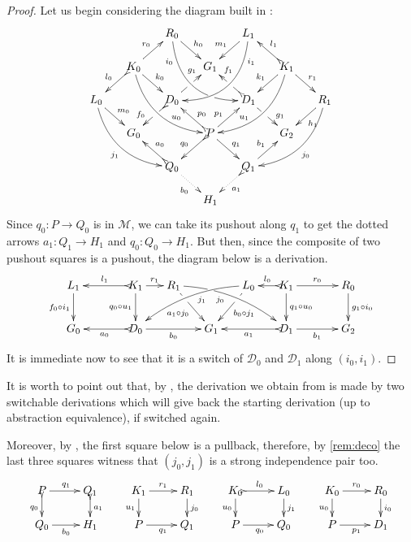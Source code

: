 \documentclass[a4paper,UKenglish,cleveref,pdftex,thm-restate,numberwithinsect,anonymous]{lipics}
\def\G{\textbf {\textup{G}}}
\newcommand{\dder}[1]{\mathscr{#1}}
\begin{document}
\begin{proof}

  Let us begin considering the diagram
  built in :
  \[\xymatrix@C=15pt@R=15pt{&&R_0
      \ar@/_.8cm/[ddrr]_(.2){i_0}|(.7)\hole \ar[dr]^{h_0}&&
      L_1\ar@/^.8cm/[ddll]^(.2){i_1}
      \ar[dl]_{m_1}\\&K_0\ar[dr]^{k_0}\ar@{>->}[dl]_{l_0}
      \ar@/_.6cm/[ddrr]^(.65){u_0}\ar[ur]^{r_0}&& G_1 && K_1
      \ar@/^.6cm/[ddll]_(.65){u_1}\ar[dl]_{k_1}\ar@{>->}[lu]_{l_1}
      \ar[dr]^{r_1}\\L_0 \ar[dr]^{m_0} \ar@{>}@/_.6cm/[ddrr]_{j_1}&& D_0
      \ar@{>->}[dl]|(.42)\hole_(.64){f_0}\ar[ur]|(.48)\hole^(.7){g_1}&&D_1
      \ar[dr]|(.42)\hole^(.65){g_1}
      \ar@{>->}[ul]|(.48)\hole_(.7){f_1}&&R_1\ar@/^.6cm/[ddll]^{j_0}\ar[dl]^{h_1}\\&G_0
      &&P\ar[dr]^{q_1}
      \ar@{>->}[dl]_{q_0}\ar[ur]^(.4){p_1}\ar@{>->}[ul]_(.4){p_0}&&G_2\\&&Q_0
      \ar@{>->}@{>->}[ul]_{a_0} \ar@{.>}[dr]_{b_0} &&Q_1\ar[ur]^{b_1}
      \ar@{>.>}[dl]^{a_1} \\ &&&H_1 }\] Since $q_0\colon P\to Q_0$ is in
  $\mathcal{M}$, we can take its pushout along $q_1$ to get the dotted
  arrows $a_1\colon Q_1\to H_1$ and $q_0\colon Q_0\to H_1$. But then,
  since the composite of two pushout squares is a pushout, the diagram
  below is a derivation.
  \[\xymatrix@C=15pt{L_1 \ar[d]_{f_0 \circ i_1}&& K_1
      \ar[d]_{q_0\circ u_1}\ar@{>->}[ll]_{l_1} \ar[r]^{r_1} & R_1
      \ar@/^.35cm/[drrr]|(.3)\hole_(.4){j_0} \ar[dr]|(.3)\hole_{a_1\circ
        j_0} && L_0 \ar@/_.35cm/[dlll]^(.4){j_1} \ar[dl]|(.3)\hole^{b_0\circ
        j_1}& K_1 \ar[d]^{q_1\circ u_0}\ar@{>->}[l]_{l_0} \ar[rr]^{r_0} && R_0
      \ar[d]^{g_1\circ i_0} \\G_0 && \ar@{>->}[ll]^{a_0} D_0 \ar[rr]_{b_0}&&
      G_1 && \ar@{>->}[ll]^{a_1} D_1 \ar[rr]_{b_1}&& G_2}\] It is immediate
  now to see that it is a switch of $\dder{D}_0$ and $\dder{D}_1$ along
  $(i_0, i_1)$.
\end{proof}

\begin{remark}
	\label{rem:church}
	It is worth to point out that, by
	, the derivation we obtain from
	 is made by two switchable derivations which will
	give back the starting derivation (up to abstraction equivalence),
	if switched again.
	
	Moreover, by , the first square below is a
	pullback, therefore, by \cref{rem:deco} the last three squares
	witness that $(j_0, j_1)$ is a strong independence pair too.
	\[
	\xymatrix@R=15pt{P\ar[r]^{q_1} \ar@{>->}[d]_{q_0}&Q_1
		\ar@{>->}[d]^{a_1}&K_1 \ar[r]^{r_1} \ar[d]_{u_1}& R_1
		\ar[d]^{j_0} & K_0 \ar@{>->}[r]^{l_0} \ar[d]_{u_0}& L_0
		\ar[d]^{j_1}&K_0 \ar[r]^{r_0} \ar[d]_{u_0}& R_0\ar[d]^{i_0} \\
		Q_ 0\ar[r]_{b_0}&H_1&P \ar[r]_{q_1} & Q_1 &P \ar[r]_{q_0} &
		Q_0&P \ar[r]_{p_1} & D_1}
	\]
\end{remark}
\end{document}
